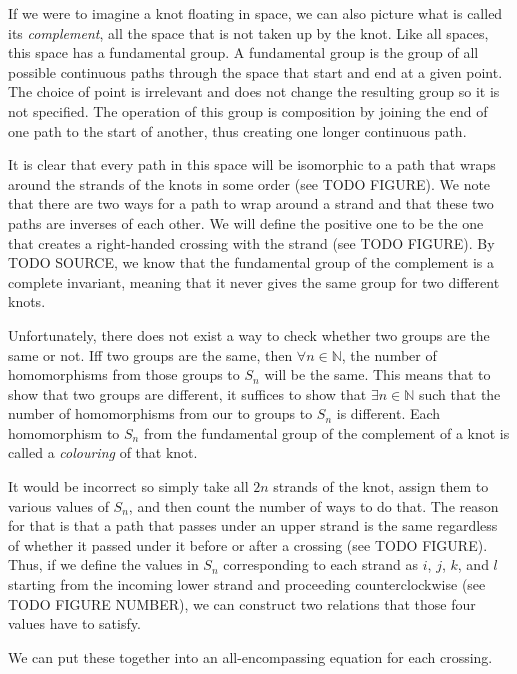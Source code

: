 \begin{paper}
If we were to imagine a knot floating in space, we can also picture what is
called its \textit{complement}, all the space that is not taken up by the knot.
Like all spaces, this space has a fundamental group.
A fundamental group is the group of all possible continuous paths through the
space that start and end at a given point.
The choice of point is irrelevant and does not change the resulting group so it
is not specified.
The operation of this group is composition by joining the end of one path to the
start of another, thus creating one longer continuous path.

It is clear that every path in this space will be isomorphic to a path that
wraps around the strands of the knots in some order (see TODO FIGURE).
We note that there are two ways for a path to wrap around a strand and that
these two paths are inverses of each other.
We will define the positive one to be the one that creates a right-handed
crossing with the strand (see TODO FIGURE).
By TODO SOURCE, we know that the fundamental group of the complement is a
complete invariant, meaning that it never gives the same group for two different
knots.

Unfortunately, there does not exist a way to check whether two groups are the
same or not.
Iff two groups are the same, then $\forall n\in\mathbb N$, the number of
homomorphisms from those groups to $S_n$ will be the same.
This means that to show that two groups are different, it suffices to show that
$\exists n\in\mathbb N$ such that the number of homomorphisms from our to groups
to $S_n$ is different.
Each homomorphism to $S_n$ from the fundamental group of the complement of a
knot is called a \textit{colouring} of that knot.

It would be incorrect so simply take all $2n$ strands of the knot, assign them
to various values of $S_n$, and then count the number of ways to do that.
The reason for that is that a path that passes under an upper strand is the same
regardless of whether it passed under it before or after a crossing (see TODO
FIGURE).
Thus, if we define the values in $S_n$ corresponding to each strand as $i$, $j$,
$k$, and $l$ starting from the incoming lower strand and proceeding
counterclockwise (see TODO FIGURE NUMBER), we can construct two relations that
those four values have to satisfy.


We can put these together into an all-encompassing equation for each crossing.


\end{paper}
